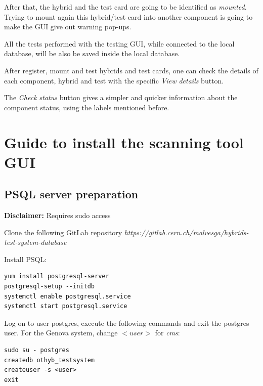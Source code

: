 \documentclass[10pt,a4paper]{article}
\begin{document}
After that, the hybrid and the test card are going to be identified as \textit{mounted}. Trying to mount again this hybrid/test card into another component is going to make the GUI give out warning pop-ups. 

All the tests performed with the testing GUI, while connected to the local database, will be also be saved inside the local database.

After register, mount and test hybrids and test cards, one can check the details of each component, hybrid and test with the specific \textit{View details} button.

The \textit{Check status} button gives a simpler and quicker information about the component status, using the labels mentioned before.


\newpage

\appendix

\appendixpage
\section{Guide to install the scanning tool GUI}
\label{installscanner}

\subsection{PSQL server preparation}

\textbf{Disclaimer:} Requires sudo access

Clone the following GitLab repository \emph{https://gitlab.cern.ch/malvesga/hybrids-test-system-database}

Install PSQL: 

\begin{framed}
\begin{verbatim}
yum install postgresql-server
postgresql-setup --initdb
systemctl enable postgresql.service
systemctl start postgresql.service
\end{verbatim}
\end{framed}

Log on to user postgres, execute the following commands and exit the postgres user. For the Genova system, change $<user>$ for \textit{cms}: 

\begin{framed}
\begin{verbatim}
sudo su - postgres
createdb othyb_testsystem
createuser -s <user>
exit
\end{verbatim}
\end{framed}
\end{document}
